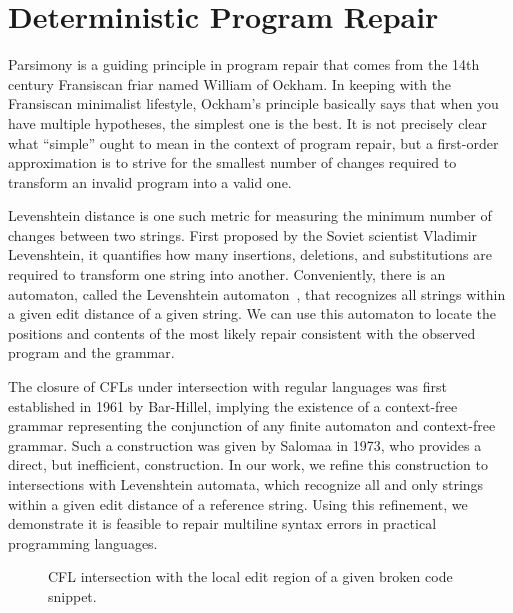 \chapter{\rm\bfseries Deterministic Program Repair}
\label{ch:chapter02}

Parsimony is a guiding principle in program repair that comes from the 14th century Fransiscan friar named William of Ockham. In keeping with the Fransiscan minimalist lifestyle, Ockham's principle basically says that when you have multiple hypotheses, the simplest one is the best. It is not precisely clear what ``simple'' ought to mean in the context of program repair, but a first-order approximation is to strive for the smallest number of changes required to transform an invalid program into a valid one.

Levenshtein distance is one such metric for measuring the minimum number of changes between two strings. First proposed by the Soviet scientist Vladimir Levenshtein, it quantifies how many insertions, deletions, and substitutions are required to transform one string into another. Conveniently, there is an automaton, called the Levenshtein automaton~\cite{schulz2002fast}, that recognizes all strings within a given edit distance of a given string. We can use this automaton to locate the positions and contents of the most likely repair consistent with the observed program and the grammar.

The closure of CFLs under intersection with regular languages was first established in 1961 by Bar-Hillel, implying the existence of a context-free grammar representing the conjunction of any finite automaton and context-free grammar. Such a construction was given by Salomaa in 1973, who provides a direct, but inefficient, construction. In our work, we refine this construction to intersections with Levenshtein automata, which recognize all and only strings within a given edit distance of a reference string. Using this refinement, we demonstrate it is feasible to repair multiline syntax errors in practical programming languages.

\begin{wrapfigure}{r}{0.4\textwidth}
  \vspace{-0.2cm}
  
  \vspace{-0.3cm}
  \caption{CFL intersection with the local edit region of a given broken code snippet.}
  \vspace{-0.2cm}
\end{wrapfigure}

